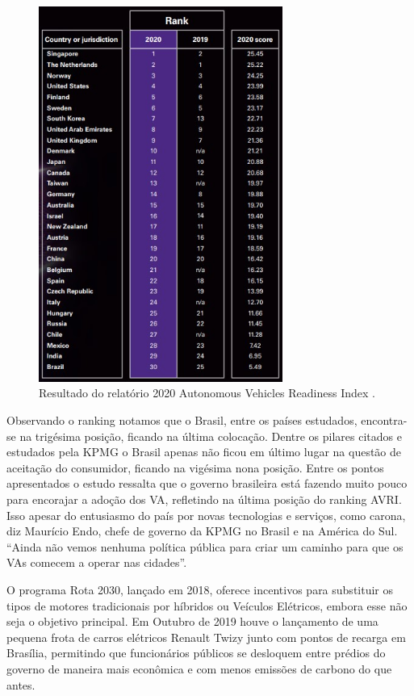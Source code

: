 \begin{figure}[H]
\centering
\includegraphics[width=8cm]{Figures/rank.jpg}
\caption{Resultado do relatório 2020 Autonomous Vehicles Readiness Index \cite{KPMG}.}
\label{KPMG}
\end{figure}

Observando o ranking notamos que o Brasil, entre os países estudados, encontra-se na trigésima posição, ficando na última colocação. Dentre os pilares citados e estudados pela KPMG o Brasil apenas não ficou em último lugar na questão de aceitação do consumidor, ficando na vigésima nona posição.
Entre os pontos apresentados o estudo ressalta que o governo brasileira está fazendo muito pouco para encorajar a adoção dos VA, refletindo na última posição do ranking AVRI. Isso apesar do entusiasmo do país por novas tecnologias e serviços, como carona, diz Maurício Endo, chefe de governo da KPMG no Brasil e na América do Sul. “Ainda não vemos nenhuma política pública para criar um caminho para que os VAs comecem a operar nas cidades”.

O programa Rota 2030, lançado em 2018, oferece incentivos para substituir os tipos de motores tradicionais por híbridos ou Veículos Elétricos, embora esse não seja o objetivo principal. Em Outubro de 2019 houve o lançamento de uma pequena frota de carros elétricos Renault Twizy junto com pontos de recarga em Brasília, permitindo que funcionários públicos se desloquem entre prédios do governo de maneira mais econômica e com menos emissões de carbono do que antes.

